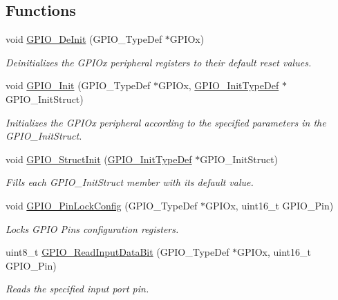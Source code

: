 \subsection*{Functions}
\begin{DoxyCompactItemize}
\item 
void \hyperlink{group___g_p_i_o_gaa60bdf3182c44b5fa818f237042f52ee}{G\-P\-I\-O\-\_\-\-De\-Init} (G\-P\-I\-O\-\_\-\-Type\-Def $\ast$G\-P\-I\-Ox)
\begin{DoxyCompactList}\small\item\em Deinitializes the G\-P\-I\-Ox peripheral registers to their default reset values. \end{DoxyCompactList}\item 
void \hyperlink{group___g_p_i_o_ga71abf9404261370d03cca449b88d3a65}{G\-P\-I\-O\-\_\-\-Init} (G\-P\-I\-O\-\_\-\-Type\-Def $\ast$G\-P\-I\-Ox, \hyperlink{struct_g_p_i_o___init_type_def}{G\-P\-I\-O\-\_\-\-Init\-Type\-Def} $\ast$G\-P\-I\-O\-\_\-\-Init\-Struct)
\begin{DoxyCompactList}\small\item\em Initializes the G\-P\-I\-Ox peripheral according to the specified parameters in the G\-P\-I\-O\-\_\-\-Init\-Struct. \end{DoxyCompactList}\item 
void \hyperlink{group___g_p_i_o_gab28de41278e7f8c63d0851e2733b10df}{G\-P\-I\-O\-\_\-\-Struct\-Init} (\hyperlink{struct_g_p_i_o___init_type_def}{G\-P\-I\-O\-\_\-\-Init\-Type\-Def} $\ast$G\-P\-I\-O\-\_\-\-Init\-Struct)
\begin{DoxyCompactList}\small\item\em Fills each G\-P\-I\-O\-\_\-\-Init\-Struct member with its default value. \end{DoxyCompactList}\item 
void \hyperlink{group___g_p_i_o_gad2f2e615928c69fd0d8c641a7cedaafc}{G\-P\-I\-O\-\_\-\-Pin\-Lock\-Config} (G\-P\-I\-O\-\_\-\-Type\-Def $\ast$G\-P\-I\-Ox, uint16\-\_\-t G\-P\-I\-O\-\_\-\-Pin)
\begin{DoxyCompactList}\small\item\em Locks G\-P\-I\-O Pins configuration registers. \end{DoxyCompactList}\item 
uint8\-\_\-t \hyperlink{group___g_p_i_o_ga98772ef6b639b3fa06c8ae5ba28d3aaa}{G\-P\-I\-O\-\_\-\-Read\-Input\-Data\-Bit} (G\-P\-I\-O\-\_\-\-Type\-Def $\ast$G\-P\-I\-Ox, uint16\-\_\-t G\-P\-I\-O\-\_\-\-Pin)
\begin{DoxyCompactList}\small\item\em Reads the specified input port pin. \end{DoxyCompactList}\item 

\end{DoxyCompactItemize}
